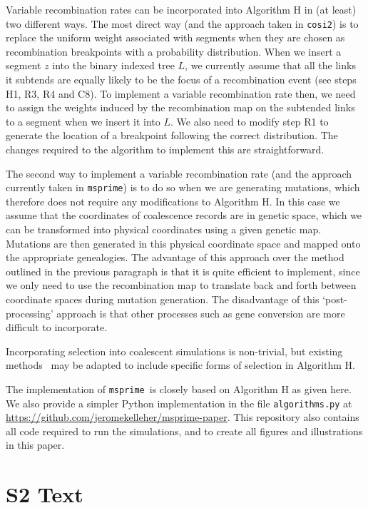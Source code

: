 \documentclass[10pt,letterpaper]{article}
\newcommand{\msprime}[0]{\texttt{msprime}}
\newcommand{\cosi}[0]{\texttt{cosi2}}
\begin{document}
Variable recombination rates can be incorporated into Algorithm H in (at least)
two different ways. The most direct way (and the approach taken in \cosi) is to
replace the uniform weight associated with segments when they are chosen as
recombination breakpoints with a probability distribution. When we insert a
segment $z$ into the binary indexed tree $L$, we currently assume that all the
links it subtends are equally likely to be the focus of a recombination event
(see steps H1, R3, R4 and C8). To implement a variable recombination rate then,
we need to assign the weights induced by the recombination map on the
subtended links to a segment when we insert it into $L$. We also need to modify
step R1 to generate the location of a breakpoint following the correct
distribution. The changes required to the algorithm to implement this are
straightforward.

The second way to implement a variable recombination rate (and the approach
currently taken in \msprime) is to do so when we are generating mutations,
which therefore does not require any modifications to Algorithm H. In this case
we assume that the coordinates of coalescence records are in genetic space,
which we can be transformed into physical coordinates using a given genetic
map. Mutations are then generated in this physical coordinate space
and mapped onto the appropriate genealogies. The
advantage of this approach over the method outlined in the previous paragraph
is that it is quite efficient to implement, since we only need to use the
recombination map to translate back and forth between coordinate spaces during
mutation generation. The disadvantage of this `post-processing' approach is
that other processes such as gene conversion are more difficult to incorporate.

Incorporating selection into coalescent simulations is non-trivial,
but existing methods~\citep{sc04,ti09,eh10,sss14} may be adapted to include
specific forms of selection in Algorithm H.

The implementation of \msprime\ is closely based on Algorithm H as given here.
We also provide a simpler Python implementation in the file
\texttt{algorithms.py} at
\url{https://github.com/jeromekelleher/msprime-paper}. This repository also
contains all code required to run the simulations, and to create all figures
and illustrations in this paper.

\section*{S2 Text}
\label{app-algorithm-illustration}
\end{document}
